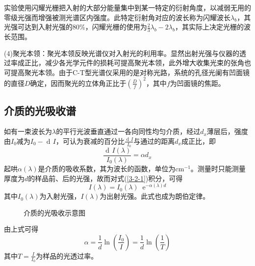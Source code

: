 \documentclass[UTF-8,twoside,cs4size]{ctexart}
\DeclareMathOperator\dif{d\!}
\newcommand*{\me}{\mathop{}\!\mathrm{e}}
\begin{document}
	实验使用闪耀光栅把入射的大部分能量集中到某一特定的衍射角度，以减弱无用的零级光强而增强被测光谱区内强度。此特定衍射角对应的波长称为闪耀波长$ \lambda_b $，其光强可达到入射光强的80\%，闪耀光栅的使用为$ \frac23\lambda_b-2\lambda_b $，其实际上决定光栅的波长范围。
	
	(4)聚光本领：聚光本领反映光谱仪对入射光的利用率。显然出射光强与仪器的透过率成正比，减少各光学元件的损耗可提高聚光本领，此外增大收集光束的张角也可提高聚光本领。由于C-T型光谱仪采用的是对称光路，系统的孔径光阑有凹面镜的直径$ D $确定，因而聚光的立体角正比于$ \left(\frac Df\right)^2 $，其中$ f $为凹面镜的焦距。
	
	\subsection{介质的光吸收谱}
	如有一束波长为$ \lambda $的平行光波垂直通过一各向同性均匀介质，经过$ d_x $薄层后，强度由$ I_0 $减为$ I_0-\dif I $，可认为衰减的百分比$ \frac{\dif I}{I_0} $与通过的距离$ d_x $成正比，即
	\begin{equation}\label{3-2-1}
		\frac{\dif I(\lambda)}{I_0(\lambda)}=\alpha d_x
	\end{equation}
	起哄$ \alpha(\lambda) $是介质的吸收系数，其为波长的函数，单位为$ \mathrm{cm}^{-1} $。测量时只能测量厚度为$ d $的样品前、后的光强，故而对式(\ref{3-2-1})积分，可得
	\begin{equation}\label{3-2-2}
		I(\lambda)=I_0(\lambda)\me^{-\alpha(\lambda)d}
	\end{equation}
	其中$ I_0(\lambda) $为入射光强，$ I(\lambda) $为出射光强。此式也成为朗伯定律。
	
	\begin{figure}[h]
		\centering
		\caption{介质的光吸收示意图}
	\end{figure}

	由上式可得
	\begin{equation}\label{3-2-3}
		\alpha=\frac1d\ln\left(\frac{I_0}{I}\right)=\frac1d\ln\left(\frac1T\right)
	\end{equation}
	其中$ T=\frac{I}{I_0} $为样品的光透过率。
	
\end{document}

